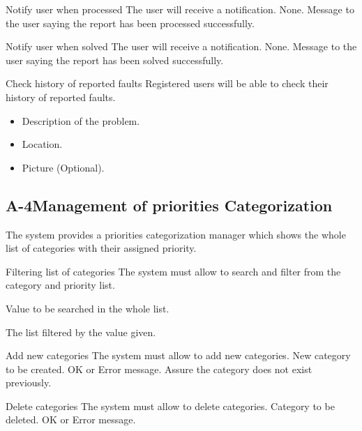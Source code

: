 \begin{requirement}{Notify user when processed}
\reqdesc The user will receive a notification.
\reqin None.
\reqout Message to the user saying the report has been processed successfully.
\end{requirement}

\begin{requirement}{Notify user when solved}
\reqdesc The user will receive a notification.
\reqin None.
\reqout Message to the user saying the report has been solved successfully.
\end{requirement}

\begin{requirement}{Check history of reported faults}
\reqdesc Registered users will be able to check their history of reported faults.
\reqin 
\begin{itemize}
	\item Description of the problem.
	\item Location.
	\item Picture (Optional).
\end{itemize}
\reqout
\reqsteps
\end{requirement}



\subsection{A-4Management of priorities Categorization}

The system provides a priorities categorization manager which shows the whole list of categories with their assigned priority. 

\begin{requirement}{Filtering list of categories}
\reqdesc The system must allow to search and filter from the category and priority list.

\reqin Value to be searched in the whole list.

\reqout The list filtered by the value given.
\end{requirement}

\begin{requirement}{Add new categories}
\reqdesc  The system must allow to add new categories.
\reqin New category to be created.
\reqout OK or Error message.
\reqsteps Assure the category does not exist previously.
\end{requirement}

\begin{requirement}{Delete categories}
\reqdesc  The system must allow to delete categories.
\reqin Category to be deleted.
\reqout OK or Error message.
\end{requirement}


